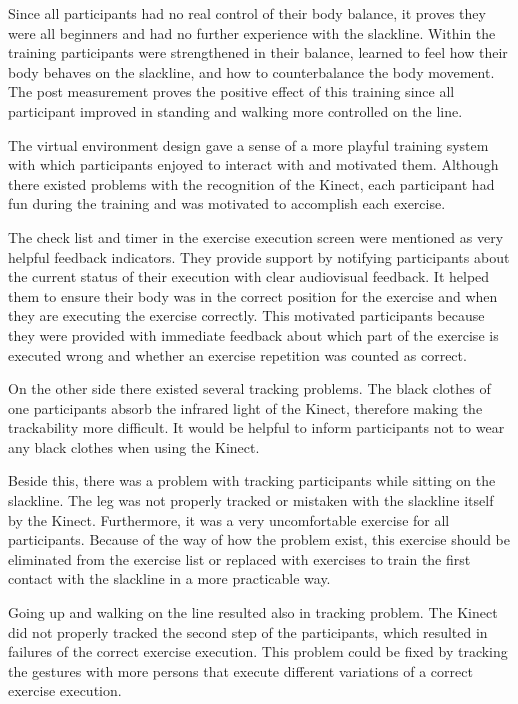 Since all participants had no real control of their body balance, it proves they were all beginners and had no further experience with the slackline.
Within the training participants were strengthened in their balance, learned to feel how their body behaves on the slackline, and how to counterbalance the body movement.
The post measurement proves the positive effect of this training since all participant improved in standing and walking more controlled on the line.

The virtual environment design gave a sense of a more playful training system with which participants enjoyed to interact with and motivated them.
Although there existed problems with the recognition of the Kinect, each participant had fun during the training and was motivated to accomplish each exercise.

The check list and timer in the exercise execution screen were mentioned as very helpful feedback indicators.
They provide support by notifying participants about the current status of their execution with clear audiovisual feedback.
It helped them to ensure their body was in the correct position for the exercise and when they are executing the exercise correctly.
This motivated participants because they were provided with immediate feedback about which part of the exercise is executed wrong and whether an exercise repetition was counted as correct.

On the other side there existed several tracking problems.
The black clothes of one participants absorb the infrared light of the Kinect, therefore making the trackability more difficult.
It would be helpful to inform participants not to wear any black clothes when using the Kinect.

Beside this, there was a problem with tracking participants while sitting on the slackline.
The leg was not properly tracked or mistaken with the slackline itself by the Kinect.
Furthermore, it was a very uncomfortable exercise for all participants.
Because of the way of how the problem exist, this exercise should be eliminated from the exercise list or replaced with exercises to train the first contact with the slackline in a more practicable way.

Going up and walking on the line resulted also in tracking problem.
The Kinect did not properly tracked the second step of the participants, which resulted in failures of the correct exercise execution.
This problem could be fixed by tracking the gestures with more persons that execute different variations of a correct exercise execution.

